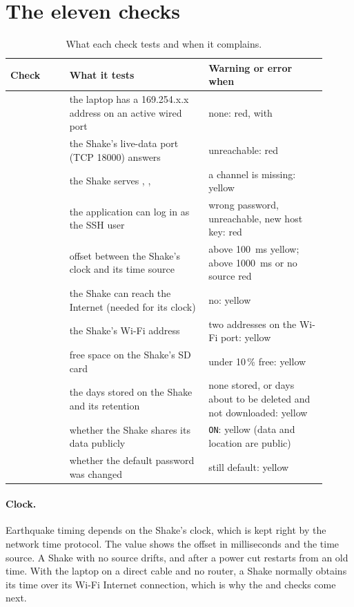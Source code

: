 \section{The eleven checks}
\begin{table}[tbp]
\centering\small
\caption{What each check tests and when it complains.}\label{tab:checks}
\begin{tabular}{@{}L{0.17\linewidth}L{0.40\linewidth}L{0.34\linewidth}@{}}
\toprule
Check & What it tests & Warning or error when\\ \midrule
{} & the laptop has a 169.254.x.x address on an active wired port & none: red, with \\
 & the Shake's live-data port (TCP 18000) answers & unreachable: red\\
 & the Shake serves , ,  & a channel is missing: yellow\\
 & the application can log in as the SSH user & wrong password, unreachable, new host key: red\\
 & offset between the Shake's clock and its time source & above 100~ms yellow; above 1000~ms or no source red\\
 & the Shake can reach the Internet (needed for its clock) & no: yellow\\
 & the Shake's Wi-Fi address & two addresses on the Wi-Fi port: yellow\\
 & free space on the Shake's SD card & under 10\,\% free: yellow\\
 & the days stored on the Shake and its retention & none stored, or days about to be deleted and not downloaded: yellow\\
 & whether the Shake shares its data publicly & \texttt{ON}: yellow (data and location are public)\\
 & whether the default password was changed & still default: yellow\\
\bottomrule
\end{tabular}
\end{table}

\paragraph{Clock.} Earthquake timing depends on the Shake's clock, which is kept right by the network time protocol. The value shows
the offset in milliseconds and the time source. A Shake with no source drifts, and after a power cut restarts from an old time. With
the laptop on a direct cable and no router, a Shake normally obtains its time over its Wi-Fi Internet connection, which
is why the  and  checks come next.

